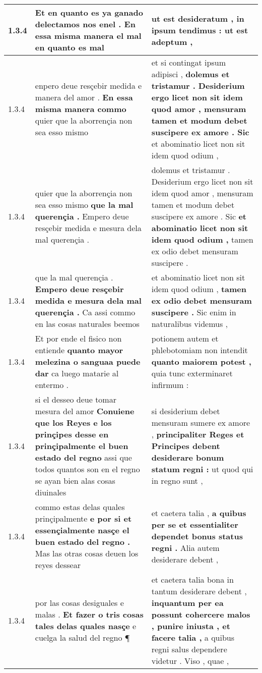 \begin{tabular}{|p{1cm}|p{6.5cm}|p{6.5cm}|}
1.3.4 & Et en quanto es ya ganado delectamos nos enel . \textbf{ En essa misma manera el mal } en quanto es mal & ut est desideratum , \textbf{ in ipsum tendimus : } ut est adeptum , \\\hline
1.3.4 & enpero deue resçebir medida e manera del amor . \textbf{ En essa misma manera commo } quier que la aborrençia non sea esso mismo & et si contingat ipsum adipisci , \textbf{ dolemus et tristamur . Desiderium ergo licet non sit idem quod amor , mensuram tamen et modum debet suscipere ex amore . Sic } et abominatio licet non sit idem quod odium , \\\hline
1.3.4 & quier que la aborrençia non sea esso mismo \textbf{ que la mal querençia . } Empero deue resçebir medida e mesura dela mal querençia . & dolemus et tristamur . Desiderium ergo licet non sit idem quod amor , mensuram tamen et modum debet suscipere ex amore . Sic \textbf{ et abominatio licet non sit idem quod odium , } tamen ex odio debet mensuram suscipere . \\\hline
1.3.4 & que la mal querençia . \textbf{ Empero deue resçebir medida e mesura dela mal querençia . } Ca assi commo en las cosas naturales beemos & et abominatio licet non sit idem quod odium , \textbf{ tamen ex odio debet mensuram suscipere . } Sic enim in naturalibus videmus , \\\hline
1.3.4 & Et por ende el fisico non entiende \textbf{ quanto mayor melezina o sanguaa puede dar } ca luego matarie al entermo . & potionem autem et phlebotomiam non intendit \textbf{ quanto maiorem potest , } quia tunc exterminaret infirmum : \\\hline
1.3.4 & si el desseo deue tomar mesura del amor \textbf{ Conuiene que los Reyes e los prinçipes desse en prinçipalmente el buen estado del regno } assi que todos quantos son en el regno se ayan bien alas cosas diuinales & si desiderium debet mensuram sumere ex amore , \textbf{ principaliter Reges et Principes debent desiderare bonum statum regni : } ut quod qui in regno sunt , \\\hline
1.3.4 & commo estas delas quales prinçipalmente \textbf{ e por si et essençialmente nasçe el buen estado del regno . } Mas las otras cosas deuen los reyes dessear & et caetera talia , \textbf{ a quibus per se et essentialiter dependet bonus status regni . } Alia autem desiderare debent , \\\hline
1.3.4 & por las cosas desiguales e malas . \textbf{ Et fazer o tris cosas tales delas quales nasçe } e cuelga la salud del regno ¶ & et caetera talia bona in tantum desiderare debent , \textbf{ inquantum per ea possunt cohercere malos , punire iniusta , et facere talia , } a quibus regni salus dependere videtur . Viso , quae , \\\hline

\end{tabular}
